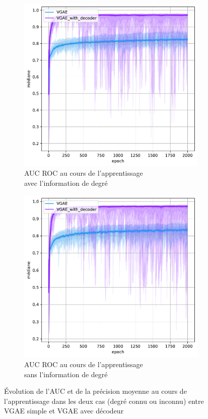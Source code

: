 \documentclass{article}
\begin{document}
\begin{figure}[H]
    \begin{subfigure}{0.45\textwidth}
      \includegraphics[width=\textwidth]{graphics/AUCs_degree_decoder_cinf.svg.pdf}
      \centering
      \caption{AUC ROC au cours de l'apprentissage\\ avec l'information de degré}
    \end{subfigure}
    \begin{subfigure}{0.45\textwidth}
      \includegraphics[width=\textwidth]{graphics/AUCs_no_degree_decoder_cinf.svg.pdf}
      \centering
      \caption{AUC ROC au cours de l'apprentissage\\ sans l'information de degré}
    \end{subfigure}
    \caption{Évolution de l'AUC et de la précision moyenne au cours de l'apprentissage dans les deux cas (degré connu ou inconnu) entre VGAE simple et VGAE avec décodeur}
    \label{fig:decoder}
\end{figure}
\end{document}
